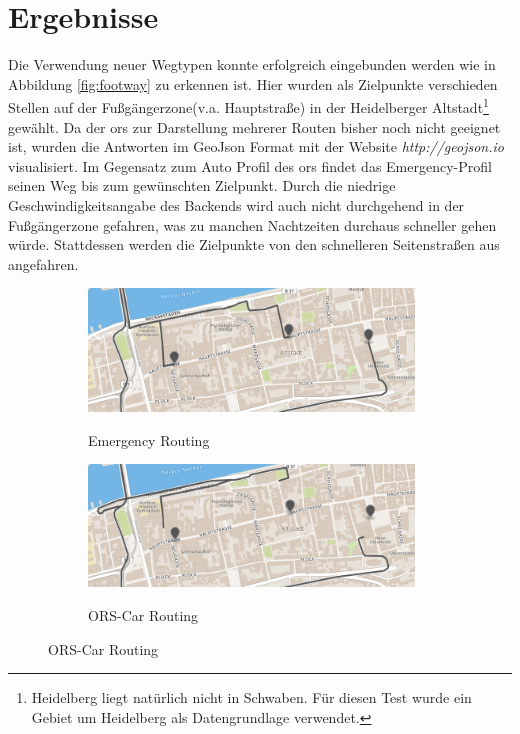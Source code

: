 \section{Ergebnisse}

Die Verwendung neuer Wegtypen konnte erfolgreich eingebunden werden wie in Abbildung \ref{fig:footway} zu erkennen ist.
Hier wurden als Zielpunkte verschieden Stellen auf der Fußgängerzone(v.a. Hauptstraße) in der Heidelberger Altstadt\footnote{Heidelberg liegt natürlich nicht in Schwaben.
Für diesen Test wurde ein Gebiet um Heidelberg als Datengrundlage verwendet.} gewählt.
Da der \gls{ors} zur Darstellung mehrerer Routen bisher noch nicht geeignet ist, wurden die Antworten im GeoJson Format mit der Website \textit{http://geojson.io} visualisiert.
Im Gegensatz zum Auto Profil des \gls{ors} findet das Emergency-Profil seinen Weg bis zum gewünschten Zielpunkt.
Durch die niedrige Geschwindigkeitsangabe des Backends wird auch nicht durchgehend in der Fußgängerzone gefahren, was zu manchen Nachtzeiten durchaus schneller gehen würde.
Stattdessen werden die Zielpunkte von den schnelleren Seitenstraßen aus angefahren.

\begin{figure}[h]
\centering
\caption{Routing in die Fußgängerzone der Heidelberger Altstadt}
\label{fig:footway}
\begin{subfigure}{0.49\textwidth}
\centering
\includegraphics[width = 0.95\textwidth]{../media/Altstadt_emergency.png} \\
\caption{Emergency Routing}
\label{fig:alteme}
\end{subfigure}
\begin{subfigure}{0.49\textwidth}
\centering
\includegraphics[width = 0.95\textwidth]{../media/Altstadt_car.png} \\
\caption{ORS-Car Routing}
\label{fig:altcar}
\end{subfigure}
\end{figure}

